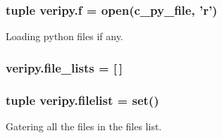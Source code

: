 \hypertarget{namespaceveripy_ae63271cecab2d5e49fee340d8d7f79e5}{
\subsubsection[{f}]{\setlength{\rightskip}{0pt plus 5cm}tuple veripy.\-f = open(c\-\_\-py\-\_\-file, 'r')}}\label{namespaceveripy_ae63271cecab2d5e49fee340d8d7f79e5}


Loading python files if any. 

\hypertarget{namespaceveripy_a960ab18337782696026b9181761b16db}{
\subsubsection[{file\-\_\-lists}]{\setlength{\rightskip}{0pt plus 5cm}veripy.\-file\-\_\-lists = \mbox{[}$\,$\mbox{]}}}\label{namespaceveripy_a960ab18337782696026b9181761b16db}
\hypertarget{namespaceveripy_a1d45ff3e325dfaf68117ad7247341056}{
\subsubsection[{filelist}]{\setlength{\rightskip}{0pt plus 5cm}tuple veripy.\-filelist = set()}}\label{namespaceveripy_a1d45ff3e325dfaf68117ad7247341056}


Gatering all the files in the files list. 

